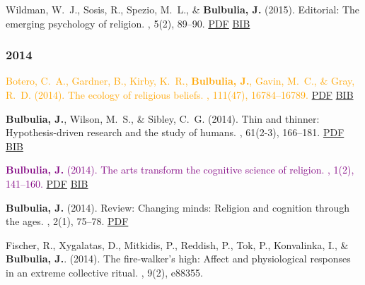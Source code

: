 \documentclass{article}
\begin{document}
\begin{thebibliography}{99}
Wildman, W.~J., Sosis, R., Spezio, M.~L., \& {\bf Bulbulia, J.} (2015). Editorial:
\newblock The emerging psychology of religion.
, 5(2), 89--90. 
\href{https://www.dropbox.com/s/wv6tlmlec5r5lhp/2015.WildmanEtAl.EmergingPysch.Rbb.pdf?dl=0}{PDF} \href{https://www.dropbox.com/s/or9ty6xkr8zsy0r/tandf_rrbb205_89.bib?dl=0}{BIB}



\subsubsection*{2014} 



\textcolor{Orange}{Botero, C.~A., Gardner, B., Kirby, K.~R., {\bf Bulbulia, J.}, Gavin, M.~C., \& Gray,
  R.~D. (2014).
\newblock The ecology of religious beliefs.
,
  111(47), 16784--16789. }
\href{http://www.pnas.org/content/early/2014/11/05/1408701111.abstract?sid=852fbd5d-6be1-4888-8126-1e4ef7c787bd}{PDF} \href{https://www.dropbox.com/s/4kmuja16tvei26q/2014.boteroEtAl.bib?dl=0}{BIB}


{\bf Bulbulia, J.}, Wilson, M.~S., \& Sibley, C.~G. (2014).
\newblock Thin and thinner: Hypothesis-driven research and the study of humans.
, 61(2-3), 166--181. 
\href{https://www.dropbox.com/s/7gj657l635ap143/NU_061_02-03_166-181.pdf?dl=0}{PDF} 
\href{https://www.dropbox.com/s/p8t8m02g13fbubu/15685276-12341314.bib?dl=0}{BIB}


\textcolor{Purple}{
{\bf Bulbulia, J.} (2014).
\newblock The arts transform the cognitive science of religion.
, 1(2), 141--160.}
\newblock \href{https://www.dropbox.com/s/gbz16yryorq7egu/pdfgt3Nzf.pdf}{PDF} 
\href{https://www.dropbox.com/s/3l1bebxg4cln7q0/2014.BulbuliaArts.bib?dl=0}{BIB}

{\bf Bulbulia, J.} (2014).
\newblock Review: Changing minds: Religion and cognition through the ages.
, 2(1), 75--78. 
\href{https://www.dropbox.com/s/8sttr3tn8j4zwo5/2014.bulbulia.article.review.Czachesz.Biro.pdf?dl=0}{PDF}


Fischer, R., Xygalatas, D., Mitkidis, P., Reddish, P., Tok, P., Konvalinka, I.,
  \& {\bf Bulbulia, J.}. (2014).
\newblock The fire-walker's high: Affect and physiological responses in an
  extreme collective ritual.
, 9(2), e88355. 



\end{thebibliography}
\end{document}
